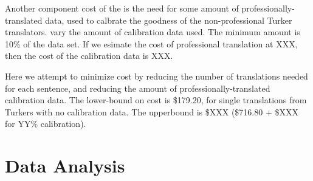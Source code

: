 \documentclass[11pt]{article}
\begin{document}
Another component cost of the   is the need for some amount of professionally-translated data, used to calbrate the goodness of the non-professional Turker translators.   vary the amount of calibration data used.  The minimum amount is 10\% of the data set.  If we esimate the cost of professional translation at XXX, then the cost of the calibration data is XXX.


Here we attempt to minimize cost by reducing the number of translations needed for each sentence, and reducing the amount of professionally-translated calibration data.  The lower-bound on cost is \$179.20, for single translations from Turkers with no calibration data.  The upperbound is \$XXX (\$716.80 + \$XXX for YY\% calibration).


\section{Data Analysis} \label{dataanaly}
\end{document}
